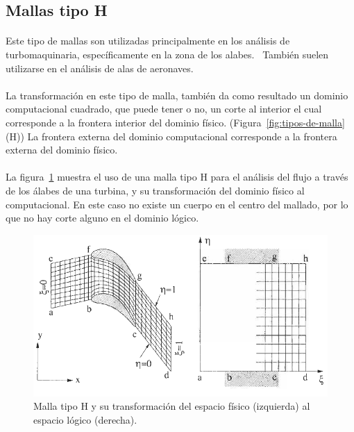 \documentclass[letterpaper, openright, 12pt]{book}
\begin{document}
    \subsection{Mallas tipo H}
    \paragraph*{}
    Este tipo de mallas son utilizadas principalmente en los análisis de
    turbomaquinaria, específicamente en la zona de los
    alabes.~\cite{blazek}\cite{best-practices-grid-generation}
    También suelen utilizarse en el análisis de alas de
    aeronaves.~\cite{vladimir-grid}

    \paragraph*{}
    La transformación en este tipo de malla, también da como resultado un
    dominio computacional cuadrado, que puede tener o no, un corte al
    interior el cual corresponde a la frontera interior del dominio físico.
    (Figura~\ref{fig:tipos-de-malla} (H)) La frontera externa del dominio
    computacional corresponde a la frontera externa del dominio físico.

    \paragraph*{}
    La figura~\ref{fig:malla-h} muestra el uso de una malla tipo H para el
    análisis del flujo a través de los álabes de una turbina, y su
    transformación del dominio físico al computacional. En este caso no
    existe un cuerpo en el centro del mallado, por lo que no hay corte
    alguno en el dominio lógico.
        \begin{figure}[htbp!]
            \centering
            \includegraphics[keepaspectratio, width=170mm]{./img/malla-h}
            \captionsetup{justification=centering, margin=2cm}
            \caption[Malla tipo O]{Malla tipo H y su transformación del
                espacio físico (izquierda) al espacio lógico (derecha).
                \cite{blazek}}
        \label{fig:malla-h}
        \end{figure}
\end{document}
